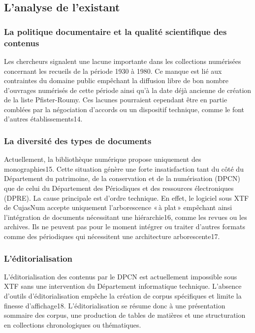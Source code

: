 \subsection{L’analyse de l’existant}

\subsubsection{La politique documentaire et la qualité scientifique des contenus} 

Les chercheurs signalent une lacune importante dans les collections numérisées concernant les recueils de la période 1930 à 1980. Ce manque est lié aux contraintes du domaine public empêchant la diffusion libre de bon nombre d’ouvrages numérisés de cette période ainsi qu’à la date déjà ancienne de création de la liste Pfister-Roumy. Ces lacunes pourraient cependant être en partie comblées par la négociation d’accords ou un dispositif technique, comme le font d’autres établissements14. 

\subsubsection{La diversité des types de documents} 

	Actuellement, la bibliothèque numérique propose uniquement des monographies15. Cette situation génère une forte insatisfaction tant du côté du Département du patrimoine, de la conservation et de la numérisation (DPCN) que de celui du Département des Périodiques et des ressources électroniques (DPRE). La cause principale est d’ordre technique. En effet, le logiciel sous XTF de CujasNum accepte uniquement l’arborescence « à plat » empêchant ainsi l’intégration de documents nécessitant une hiérarchie16, comme les revues ou les archives. Ils ne peuvent pas pour le moment intégrer ou traiter d’autres formats comme des périodiques qui nécessitent une architecture arborescente17.

\subsubsection{L’éditorialisation} 

L’éditorialisation des contenus par le DPCN est actuellement impossible sous XTF sans une intervention du Département informatique technique. L’absence d’outils d’éditorialisation empêche la création de corpus spécifiques et limite la finesse d’affichage18. L’éditorialisation se résume donc à une présentation sommaire des corpus, une production de tables de matières et une structuration en collections chronologiques ou thématiques. 

